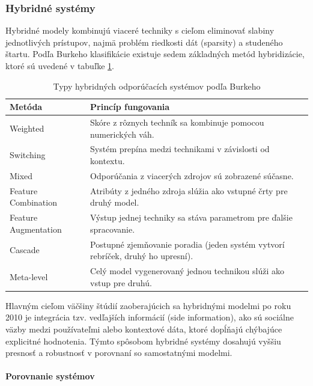 \subsubsection{Hybridné systémy}
Hybridné modely kombinujú viaceré techniky s cieľom eliminovať slabiny jednotlivých prístupov,
najmä problém riedkosti dát (sparsity) a studeného štartu. Podľa Burkeho klasifikácie existuje sedem základných metód hybridizácie, ktoré sú uvedené v tabuľke \ref{tab:hybrid_types}.
\begin{table}[ht]
\centering
\caption{Typy hybridných odporúčacích systémov podľa Burkeho \cite{ko2022survey}}
\label{tab:hybrid_types}
\begin{tabular}{|l|p{9cm}|}
\hline
\textbf{Metóda} & \textbf{Princíp fungovania} \\ \hline
Weighted & Skóre z rôznych techník sa kombinuje pomocou numerických váh. \\ \hline
Switching & Systém prepína medzi technikami v závislosti od kontextu. \\ \hline
Mixed & Odporúčania z viacerých zdrojov sú zobrazené súčasne. \\ \hline
Feature Combination & Atribúty z jedného zdroja slúžia ako vstupné črty pre druhý model. \\ \hline
Feature Augmentation & Výstup jednej techniky sa stáva parametrom pre ďalšie spracovanie. \\ \hline
Cascade & Postupné zjemňovanie poradia (jeden systém vytvorí rebríček, druhý ho upresní). \\ \hline
Meta-level & Celý model vygenerovaný jednou technikou slúži ako vstup pre druhú. \\ \hline
\end{tabular}
\end{table}
Hlavným cieľom väčšiny štúdií zaoberajúcich sa hybridnými modelmi po roku 2010 je integrácia tzv. vedľajších informácií (side information), 
ako sú sociálne väzby medzi používateľmi alebo kontextové dáta, 
ktoré dopĺňajú chýbajúce explicitné hodnotenia. Týmto spôsobom hybridné systémy 
dosahujú vyššiu presnosť a robustnosť v porovnaní so samostatnými modelmi.

\paragraph{Porovnanie systémov}

